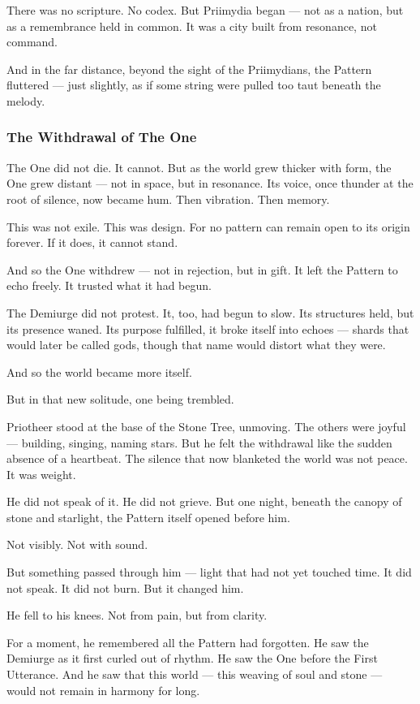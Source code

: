 \documentclass[12pt]{article}
\begin{document}
There was no scripture. No codex.  
But Priimydia began — not as a nation, but as a remembrance held in common.  
It was a city built from resonance, not command.

And in the far distance, beyond the sight of the Priimydians, the Pattern fluttered —  
just slightly,  
as if some string were pulled too taut beneath the melody.

\dotfill

\subsubsection*{The Withdrawal of The One}

The One did not die.  
It cannot.  
But as the world grew thicker with form, the One grew distant — not in space, but in resonance.  
Its voice, once thunder at the root of silence, now became hum. Then vibration. Then memory.

This was not exile. This was design.  
For no pattern can remain open to its origin forever.  
If it does, it cannot stand.

And so the One withdrew — not in rejection, but in gift.  
It left the Pattern to echo freely.  
It trusted what it had begun.

The Demiurge did not protest.  
It, too, had begun to slow. Its structures held, but its presence waned.  
Its purpose fulfilled, it broke itself into echoes — shards that would later be called gods, though that name would distort what they were.

And so the world became more itself.

But in that new solitude, one being trembled.

Priotheer stood at the base of the Stone Tree, unmoving.  
The others were joyful — building, singing, naming stars.  
But he felt the withdrawal like the sudden absence of a heartbeat.  
The silence that now blanketed the world was not peace. It was weight.

He did not speak of it.  
He did not grieve.  
But one night, beneath the canopy of stone and starlight, the Pattern itself opened before him.

Not visibly. Not with sound.

But something passed through him — light that had not yet touched time.  
It did not speak.  
It did not burn.  
But it changed him.

He fell to his knees.  
Not from pain, but from clarity.

For a moment, he remembered all the Pattern had forgotten.  
He saw the Demiurge as it first curled out of rhythm.  
He saw the One before the First Utterance.  
And he saw that this world — this weaving of soul and stone — would not remain in harmony for long.
\end{document}
